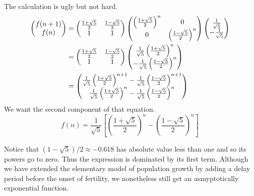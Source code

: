 The calculation is ugly but not hard.
\begin{align*}
  \begin{pmatrix} f(n+1) \\ f(n) \end{pmatrix}
  &=\begin{pmatrix}
     \frac{1+\sqrt{5}}{2}  &\frac{1-\sqrt{5}}{2} \\
     1                     &1
   \end{pmatrix}
   \begin{pmatrix}
     \left(\frac{1+\sqrt{5}}{2}\right)^n  &0   \\
     0                                    &\left(\frac{1-\sqrt{5}}{2}\right)^n
   \end{pmatrix}
  \begin{pmatrix} \frac{1}{\sqrt{5}} \\ -\frac{1}{\sqrt{5}} \end{pmatrix}       \\                     &=\begin{pmatrix}
     \frac{1+\sqrt{5}}{2}  &\frac{1-\sqrt{5}}{2} \\
     1                     &1
   \end{pmatrix}
  \begin{pmatrix} \frac{1}{\sqrt{5}}\left(\frac{1+\sqrt{5}}{2}\right)^n \\ 
          -\frac{1}{\sqrt{5}}\left(\frac{1-\sqrt{5}}{2}\right)^n \end{pmatrix}         \\    
  &=
  \begin{pmatrix} \frac{1}{\sqrt{5}}\left(\frac{1+\sqrt{5}}{2}\right)^{n+1}  
          -\frac{1}{\sqrt{5}}\left(\frac{1-\sqrt{5}}{2}\right)^{n+1}  \\
          \frac{1}{\sqrt{5}}\left(\frac{1+\sqrt{5}}{2}\right)^n  
          -\frac{1}{\sqrt{5}}\left(\frac{1-\sqrt{5}}{2}\right)^n \end{pmatrix}   
\end{align*}
We want the second component of that equation.
\begin{equation*}
  f(n)=\frac{1}{\sqrt{5}}\left[\left(\frac{1+\sqrt{5}}{2}\right)^n
                               -\left(\frac{1-\sqrt{5}}{2}\right)^n\right]
\end{equation*}

Notice that $(1-\sqrt{5})/2\approx −0.618$
has absolute value less than one and so its powers go to zero.
Thus the expression is dominated by its first term. 
Although we have extended the elementary model of 
population growth by adding a delay period 
before the onset of fertility, we nonetheless 
still get an asmyptotically exponential function.

